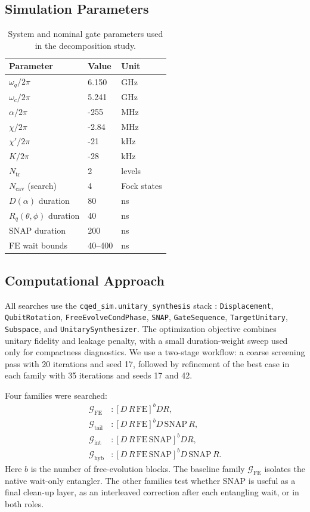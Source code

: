 \documentclass[aps,pra,twocolumn,reprint,amsmath,amssymb]{revtex4-2}
\begin{document}
\subsection{Simulation Parameters}
\begin{table}[H]
  \centering
  \caption{System and nominal gate parameters used in the decomposition study.}
  \begin{tabular}{@{}lll@{}}
    \toprule
    Parameter & Value & Unit \\
    \midrule
    $\omega_q / 2\pi$ & 6.150 & GHz \\
    $\omega_c / 2\pi$ & 5.241 & GHz \\
    $\alpha / 2\pi$ & -255 & MHz \\
    $\chi / 2\pi$ & -2.84 & MHz \\
    $\chi' / 2\pi$ & -21 & kHz \\
    $K / 2\pi$ & -28 & kHz \\
    $N_{\mathrm{tr}}$ & 2 & levels \\
    $N_{\mathrm{cav}}$ (search) & 4 & Fock states \\
    $D(\alpha)$ duration & 80 & ns \\
    $R_q(\theta,\phi)$ duration & 40 & ns \\
    SNAP duration & 200 & ns \\
    FE wait bounds & 40--400 & ns \\
    \bottomrule
  \end{tabular}
\end{table}

\subsection{Computational Approach}
All searches use the \texttt{cqed\_sim.unitary\_synthesis} stack
\cite{cqedsim}: \texttt{Displacement}, \texttt{QubitRotation},
\texttt{FreeEvolveCondPhase}, \texttt{SNAP}, \texttt{GateSequence},
\texttt{TargetUnitary}, \texttt{Subspace}, and \texttt{UnitarySynthesizer}.
The optimization objective combines unitary fidelity and leakage penalty, with a
small duration-weight sweep used only for compactness diagnostics. We use a
two-stage workflow: a coarse screening pass with 20 iterations and seed 17,
followed by refinement of the best case in each family with 35 iterations and
seeds 17 and 42.

Four families were searched:
\begin{align}
\mathcal{G}_{\mathrm{FE}} &: [D\,R\,\mathrm{FE}]^b D R, \\
\mathcal{G}_{\mathrm{tail}} &: [D\,R\,\mathrm{FE}]^b D\,\mathrm{SNAP}\,R, \\
\mathcal{G}_{\mathrm{int}} &: [D\,R\,\mathrm{FE}\,\mathrm{SNAP}]^b D R, \\
\mathcal{G}_{\mathrm{hyb}} &: [D\,R\,\mathrm{FE}\,\mathrm{SNAP}]^b D\,\mathrm{SNAP}\,R.
\end{align}
Here $b$ is the number of free-evolution blocks. The baseline family
$\mathcal{G}_{\mathrm{FE}}$ isolates the native wait-only entangler. The other
families test whether SNAP is useful as a final clean-up layer, as an
interleaved correction after each entangling wait, or in both roles.
\end{document}
